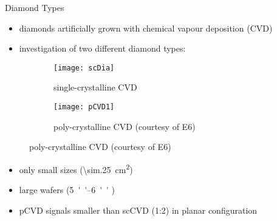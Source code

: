 \begin{frame}{Diamond Types}

	\begin{itemize}
		\itemfill
		\item diamonds artificially grown with chemical vapour deposition (CVD)
		\item investigation of two different diamond types:
	\end{itemize}
	
	\begin{figure}[h] 
		\centering
		\begin{subfigure}{0.45\textwidth}  
			\centering
			\texttt{[image: scDia]}
			\caption{single-crystalline CVD}
		\end{subfigure}
		\begin{subfigure}{0.45\textwidth} 
			\centering
			\texttt{[image: pCVD1]}
			\caption{poly-crystalline CVD (courtesy of E6)} 	
		\end{subfigure} 
	\end{figure}\vspace*{-5pt}
	
	\hspace*{10pt}
	\begin{minipage}{5.5cm}
		\begin{itemize}
			\item only small sizes (\SI{\sim.25}{cm^2})
		\end{itemize}
	\end{minipage}
	\hspace*{2pt}
	\begin{minipage}{5.5cm}
		\begin{itemize}
			\item large wafers (\SIrange{5}{6}{''} \diameter)
		\end{itemize}
	\end{minipage}
	
	\begin{itemize}
		\item pCVD signals smaller than scCVD (1:2) in planar configuration
	\end{itemize}

	
\end{frame}
